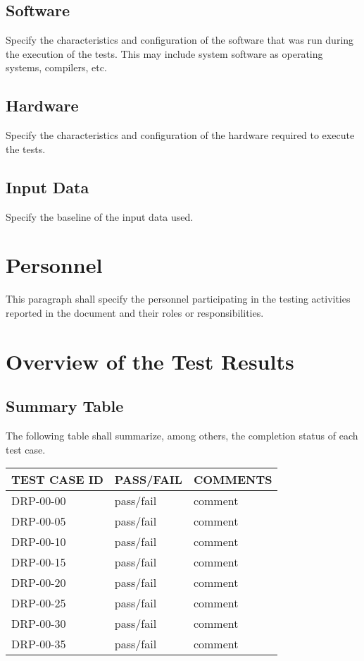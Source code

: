 \documentclass[DM,lsstdraft,STR,toc]{lsstdoc}
\begin{document}
\subsection{Software \label{sect:swconf}}
Specify the characteristics and configuration of the software that was run during the execution of the tests. This may include
system software as operating systems, compilers, etc.
\subsection{Hardware \label{sect:hwconf}}
Specify the characteristics and configuration of the hardware required to execute the tests.
\subsection{Input Data \label{sect:inputdata}}
Specify the baseline of the input data used.

\section{Personnel \label{sect:personnel}}
This paragraph shall specify the personnel participating in the testing activities reported in the document and their
roles or responsibilities.

\newpage

\section{Overview of the Test Results \label{sect:overview}}
\subsection{Summary Table \label{sect:summarytable}}
The following table shall summarize, among others, the completion status of each test case.\\

\begin{longtable} {|p{}|p{}|p{}|}\hline
{\bf TEST CASE ID} & {\bf PASS/FAIL} & {\bf COMMENTS} \\\hline
DRP-00-00 & pass/fail & comment \\\hline
DRP-00-05 & pass/fail & comment \\\hline
DRP-00-10 & pass/fail & comment \\\hline
DRP-00-15 & pass/fail & comment \\\hline
DRP-00-20 & pass/fail & comment \\\hline
DRP-00-25 & pass/fail & comment \\\hline
DRP-00-30 & pass/fail & comment \\\hline
DRP-00-35 & pass/fail & comment \\\hline
\end{longtable}
\end{document}
